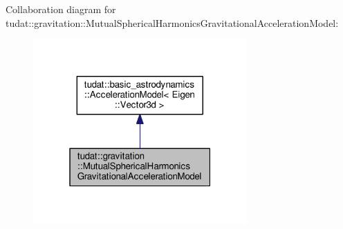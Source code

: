 Collaboration diagram for tudat\+:\+:gravitation\+:\+:Mutual\+Spherical\+Harmonics\+Gravitational\+Acceleration\+Model\+:
\nopagebreak
\begin{figure}[H]
\begin{center}
\leavevmode
\includegraphics[width=232pt]{classtudat_1_1gravitation_1_1MutualSphericalHarmonicsGravitationalAccelerationModel__coll__graph}
\end{center}
\end{figure}
